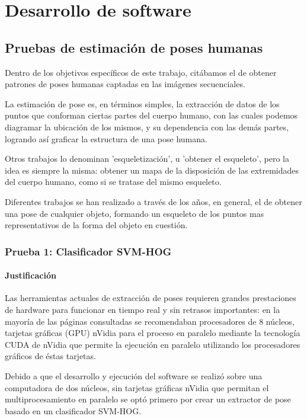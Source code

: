 \documentclass[a4paper,12pt,oneside,spanish]{book}
\begin{document}
\newpage
\chapter{Desarrollo de software}
\section{Pruebas de estimación de poses humanas}

Dentro de los objetivos específicos de este trabajo, citábamos el de obtener patrones de poses humanas captadas en las imágenes secuenciales.\par

La estimación de pose es, en términos simples, la extracción de datos  de los puntos que conforman ciertas partes del cuerpo humano, con las cuales podemos diagramar la ubicación de los mismos, y su dependencia con las demás partes, logrando así graficar la estructura de una pose humana.\par

Otros trabajos lo denominan 'esqueletización', u 'obtener el esqueleto', pero la idea es siempre la misma: obtener un mapa de la disposición de las extremidades del cuerpo humano, como si se tratase del mismo esqueleto.\par

Diferentes trabajos se han realizado a través de los años, en general, el de obtener una pose de cualquier objeto, formando un esqueleto de los puntos mas representativos de la forma del objeto en cuestión.\par

\subsection{Prueba 1: Clasificador SVM-HOG}

\subsubsection{Justificación}
Las herramientas actuales de extracción de poses requieren grandes prestaciones de hardware para funcionar en tiempo real y sin retrasos importantes: en la mayoría de las páginas consultadas se recomendaban procesadores de 8 núcleos, tarjetas gráficas (GPU) nVidia para el proceso en paralelo mediante la tecnología CUDA de nVidia que permite la ejecución en paralelo utilizando los procesadores gráficos de éstas tarjetas.\par

Debido a que el desarrollo y ejecución del software se realizó sobre una computadora de dos núcleos, sin tarjetas gráficas nVidia que permitan el multiprocesamiento en paralelo se optó primero por crear un extractor de pose basado en un clasificador SVM-HOG.\par
\end{document}
